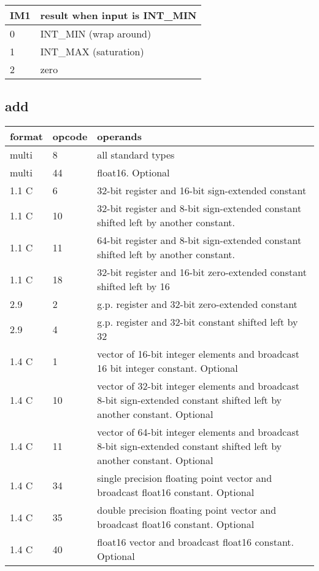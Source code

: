 \documentclass[forwardcom.tex]{subfiles}
\begin{document}
\begin{longtable}{|p{12mm}|p{80mm}|}
\endfirsthead
\endhead
\hline
\bfseries IM1 & \bfseries result when input is INT\_MIN \\ \hline
0  & INT\_MIN (wrap around) \\ \hline
1  & INT\_MAX (saturation)  \\ \hline
2  & zero                   \\ \hline
\end{longtable}
\vv


\subsection{add}
\label{table:addInstruction}
\begin{tabular}{|p{12mm}|p{15mm}|p{100mm}|}
\hline
\bfseries format & \bfseries opcode & \bfseries operands \\ \hline
multi &  8 & all standard types \\ \hline
multi & 44 & float16. Optional \\ \hline
1.1 C &  6 & 32-bit register and 16-bit sign-extended constant \\ \hline
1.1 C & 10 & 32-bit register and 8-bit sign-extended constant shifted left by another constant. \\ \hline
1.1 C & 11 & 64-bit register and 8-bit sign-extended constant shifted left by another constant. \\ \hline
1.1 C & 18 & 32-bit register and 16-bit zero-extended constant shifted left by 16 \\ \hline
2.9   &  2 & g.p. register and 32-bit zero-extended constant \\ \hline
2.9   &  4 & g.p. register and 32-bit constant shifted left by 32 \\ \hline
1.4 C &  1 & vector of 16-bit integer elements and broadcast 16 bit integer constant. Optional \\ \hline
1.4 C & 10 & vector of 32-bit integer elements and broadcast 8-bit sign-extended constant shifted left by another constant. Optional \\ \hline
1.4 C & 11 & vector of 64-bit integer elements and broadcast 8-bit sign-extended constant shifted left by another constant. Optional \\ \hline
1.4 C & 34 & single precision floating point vector and broadcast float16 constant. Optional \\ \hline
1.4 C & 35 & double precision floating point vector and broadcast float16 constant. Optional \\ \hline
1.4 C & 40 & float16 vector and broadcast float16 constant. Optional \\ \hline
\end{tabular}
\vv
\end{document}
